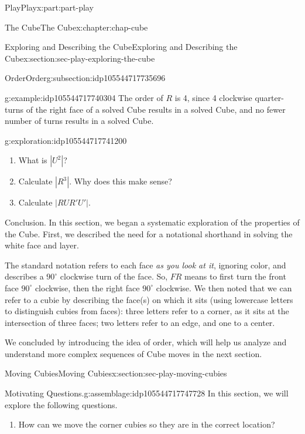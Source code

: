 \documentclass[oneside,10pt,]{book}
\numberwithin{equation}{section}
\begin{document}
\begin{partptx}{Play}{}{Play}{}{}{x:part:part-play}
\begin{chapterptx}{The Cube}{}{The Cube}{}{}{x:chapter:chap-cube}
\begin{sectionptx}{Exploring and Describing the Cube}{}{Exploring and Describing the Cube}{}{}{x:section:sec-play-exploring-the-cube}
\begin{subsectionptx}{Order}{}{Order}{}{}{g:subsection:idp105544717735696}
\begin{example}{}{g:example:idp105544717740304}%
The order of \(R\) is 4, since 4 clockwise quarter-turns of the right face of a solved Cube results in a solved Cube, and no fewer number of turns results in a solved Cube.%
\end{example}
\begin{exploration}{}{g:exploration:idp105544717741200}%
%
\begin{enumerate}
\item{}What is \(|U^2|\)?%
\item{}Calculate \(|R^3|\). Why does this make sense?%
\item{}Calculate \(|RUR' U '|\).%
\end{enumerate}
\end{exploration}%
\end{subsectionptx}
\begin{conclusion}{Conclusion.}%
In this section, we began a systematic exploration of the properties of the Cube. First, we described the need for a notational shorthand in solving the white face and layer.%
\par
The standard notation refers to each face \emph{as you look at it}, ignoring color, and describes a \(90^\circ\) clockwise turn of the face. So, \(FR\) means to first turn the front face \(90^\circ\) clockwise, then the right face \(90^\circ\) clockwise. We then noted that we can refer to a cubie by describing the face(s) on which it sits (using lowercase letters to distinguish cubies from faces): three letters refer to a corner, as it sits at the intersection of three faces; two letters refer to an edge, and one to a center.%
\par
We concluded by introducing the idea of order, which will help us analyze and understand more complex sequences of Cube moves in the next section.%
\end{conclusion}%
\end{sectionptx}
%
%
\typeout{************************************************}
\typeout{************************************************}
%
\begin{sectionptx}{Moving Cubies}{}{Moving Cubies}{}{}{x:section:sec-play-moving-cubies}
\begin{assemblage}{Motivating Questions.}{g:assemblage:idp105544717747728}%
In this section, we will explore the following questions. %
\begin{enumerate}
\item{}How can we move the corner cubies so they are in the correct location?%

\end{enumerate}
\end{assemblage}
\end{sectionptx}
\end{chapterptx}
\end{partptx}
\end{document}
